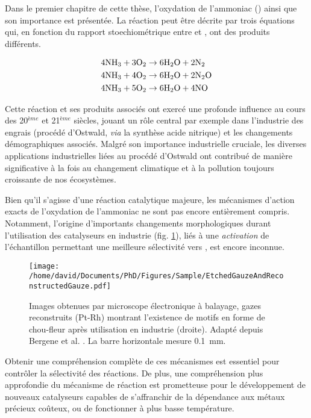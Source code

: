 Dans le premier chapitre de cette thèse, l'oxydation de l'ammoniac () ainsi que son importance est présentée.
La réaction peut être décrite par trois équations qui, en fonction du rapport stoechiométrique entre  et , ont des produits différents.

\begin{align}
    \label{eq:AmmoniaOxidationNitrogenFr}
    4 \ammonia + 3 \ce{O_2} & \rightarrow 6 \water + 2 \nitrogen \\
    \label{eq:AmmoniaOxidationNitrousOxideFr}
    4 \ammonia + 4 \ce{O_2} & \rightarrow 6 \water + 2 \nitrousoxide \\
    \label{eq:AmmoniaOxidationNitricOxideFr}
    4 \ammonia + 5 \ce{O_2} & \rightarrow 6 \water + 4 \nitricoxide
\end{align}

Cette réaction et ses produits associés ont exercé une profonde influence au cours des 20$^{ème}$ et 21$^{ème}$ siècles, jouant un rôle central par exemple dans l'industrie des engrais (procédé d'Ostwald, \textit{via} la synthèse acide nitrique) et les changements démographiques associés.
Malgré son importance industrielle cruciale, les diverses applications industrielles liées au procédé d'Ostwald ont contribué de manière significative à la fois au changement climatique et à la pollution toujours croissante de nos écosystèmes.

Bien qu’il s’agisse d’une réaction catalytique majeure, les mécanismes d’action exacts de l'oxydation de l'ammoniac ne sont pas encore entièrement compris.
Notamment, l'origine d'importants changements morphologiques durant l'utilisation des catalyseurs en industrie (fig. \ref{fig:GauzesFr}), liés à une \textit{activation} de l'échantillon permettant une meilleure sélectivité vers , est encore inconnue.

\begin{figure}[!htb]
    \centering
    \texttt{[image: /home/david/Documents/PhD/Figures/Sample/EtchedGauzeAndReconstructedGauze.pdf]}
    \caption{
    Images obtenues par microscope électronique à balayage, gazes reconstruits (Pt-Rh) montrant l'existence de motifs en forme de chou-fleur après utilisation en industrie (droite).
    Adapté depuis Bergene et al. \parencite*{Bergene1996}.
    La barre horizontale mesure \qty{0.1}{\mm}.
    }
    \label{fig:GauzesFr}
\end{figure}

Obtenir une compréhension complète de ces mécanismes est essentiel pour contrôler la sélectivité des réactions.
De plus, une compréhension plus approfondie du mécanisme de réaction est prometteuse pour le développement de nouveaux catalyseurs capables de s’affranchir de la dépendance aux métaux précieux coûteux, ou de fonctionner à plus basse température.

